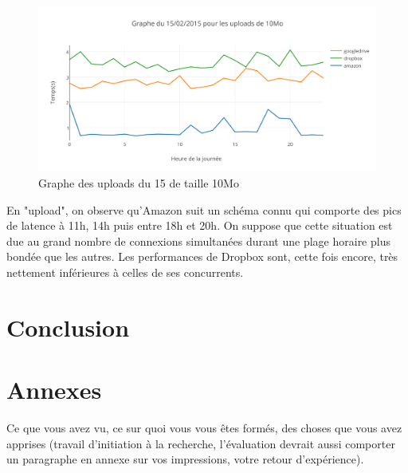 \documentclass[10pt]{article}
\begin{document}
\newpage

\begin{figure}[h]
\centering
\includegraphics[scale=0.7]{graphe_du_15022015_pour_les_uploads_de_10mo.png}
\caption{Graphe des uploads du 15 de taille 10Mo}
\end{figure}


En "upload", on observe qu'Amazon suit un schéma connu qui comporte
des pics de latence à 11h, 14h puis entre 18h et 20h. On suppose que
cette situation est due au grand nombre de connexions simultanées
durant une plage horaire plus bondée que les autres. Les performances
de Dropbox sont, cette fois encore, très nettement inférieures à
celles de ses concurrents.


\section{Conclusion}

\section{Annexes}

Ce que vous avez vu, ce sur quoi vous vous êtes formés, des choses que
vous avez apprises (travail d'initiation à la recherche, l'évaluation
devrait aussi comporter un paragraphe en annexe sur vos impressions,
votre retour d'expérience).
\end{document}

